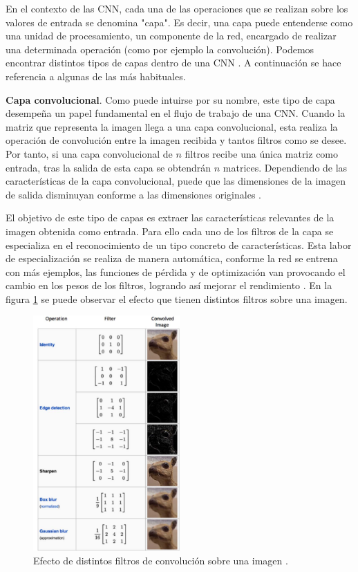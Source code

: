 En el contexto de las CNN, cada una de las operaciones que se realizan sobre los valores de entrada se denomina "capa". Es decir, una capa puede entenderse como una unidad de procesamiento, un componente de la red, encargado de realizar una determinada operación (como por ejemplo la convolución). Podemos encontrar distintos tipos de capas dentro de una CNN \cite{cnn:gu}. A continuación se hace referencia a algunas de las más habituales.

\textbf{Capa convolucional}. Como puede intuirse por su nombre, este tipo de capa desempeña un papel fundamental en el flujo de trabajo de una CNN. Cuando la matriz que representa la imagen llega a una capa convolucional, esta realiza la operación de convolución entre la imagen recibida y tantos filtros como se desee. Por tanto, si una capa convolucional de $n$ filtros recibe una única matriz como entrada, tras la salida de esta capa se obtendrán $n$ matrices. Dependiendo de las características de la capa convolucional, puede que las dimensiones de la imagen de salida disminuyan conforme a las dimensiones originales \cite{cnn:osea, cnn:gu}. 

El objetivo de este tipo de capas es extraer las características relevantes de la imagen obtenida como entrada. Para ello cada uno de los filtros de la capa se especializa en el reconocimiento de un tipo concreto de características. Esta labor de especialización se realiza de manera automática, conforme la red se entrena con más ejemplos, las funciones de pérdida y de optimización van provocando el cambio en los pesos de los filtros, logrando así mejorar el rendimiento \cite{cnn:biblia_deeplearning, cnn:osea}. En la figura \ref{fig:filtros} se puede observar el efecto que tienen distintos filtros sobre una imagen.

\begin{figure}[h]
    \centering
    \includegraphics[width=0.5\textwidth]{img/filtros.png}
    \caption{Efecto de distintos filtros de convolución sobre una imagen \cite{cnn:ieee}.}
    \label{fig:filtros}
\end{figure}


